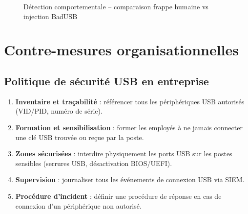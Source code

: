 \documentclass[12pt,a4paper]{report}
\begin{document}
\begin{figure}[H]
  \centering
  \caption{Détection comportementale -- comparaison frappe humaine vs injection BadUSB}
  \label{fig:detection}
\end{figure}

\section{Contre-mesures organisationnelles}

\subsection{Politique de sécurité USB en entreprise}

\begin{enumerate}
  \item \textbf{Inventaire et traçabilité} : référencer tous les périphériques USB autorisés (VID/PID, numéro de série).
  \item \textbf{Formation et sensibilisation} : former les employés à ne jamais connecter une clé USB trouvée ou reçue par la poste.
  \item \textbf{Zones sécurisées} : interdire physiquement les ports USB sur les postes sensibles (serrures USB, désactivation BIOS/UEFI).
  \item \textbf{Supervision} : journaliser tous les événements de connexion USB via SIEM.
  \item \textbf{Procédure d'incident} : définir une procédure de réponse en cas de connexion d'un périphérique non autorisé.
\end{enumerate}
\end{document}
